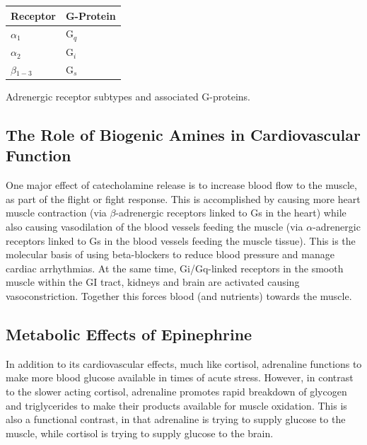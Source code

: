 \documentclass{tufte-handout}
\begin{document}
\begin{margintable}[+1cm]
  \centering
  \begin{tabular}{ll}
    \toprule
    Receptor & G-Protein \\
    \midrule
    $\alpha$$_1$ & G$_q$ \\
    $\alpha$$_2$ & G$_i$ \\
    $\beta$$_{1-3}$ & G$_s$ \\
    \bottomrule
  \end{tabular}
  \caption{Adrenergic receptor subtypes and associated G-proteins.}
  \label{tab:adrenaline-receptors}
\end{margintable}

\subsection{The Role of Biogenic Amines in Cardiovascular Function}

One major effect of catecholamine release is to increase blood flow to the muscle, as part of the flight or fight response.  This is accomplished by causing more heart muscle contraction (via $\beta$-adrenergic receptors linked to Gs in the heart) while also causing vasodilation of the blood vessels feeding the muscle (via $\alpha$-adrenergic receptors linked to Gs in the blood vessels feeding the muscle tissue).  This is the molecular basis of using beta-blockers to reduce blood pressure and manage cardiac arrhythmias. At the same time, Gi/Gq-linked receptors in the smooth muscle within the GI tract, kidneys and brain are activated causing vasoconstriction.  Together this forces blood (and nutrients) towards the muscle.  

\subsection{Metabolic Effects of Epinephrine}

In addition to its cardiovascular effects, much like cortisol, adrenaline functions to make more blood glucose available in times of acute stress.  However, in contrast to the slower acting cortisol, adrenaline promotes rapid breakdown of glycogen and triglycerides to make their products available for muscle oxidation.  This is also a functional contrast, in that adrenaline is trying to supply glucose to the muscle, while cortisol is trying to supply glucose to the brain.
\end{document}
